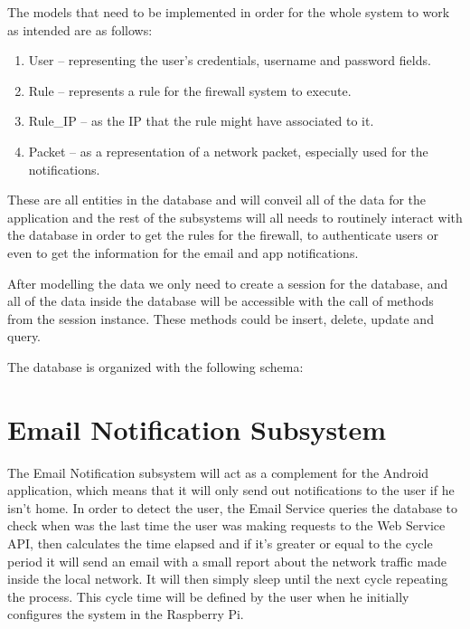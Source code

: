 \begin{enumerate}
The models that need to be implemented in order for the whole system to work as
intended are as follows:
\begin{enumerate}
	\item User -- representing the user's credentials, username and password
		fields.
	\item Rule -- represents a rule for the firewall system to execute.
	\item Rule\_IP -- as the IP that the rule might have associated to it.
	\item Packet -- as a representation of a network packet, especially used for
		the notifications.
\end{enumerate}

These are all entities in the database and will conveil all of the data for the
application and the rest of the subsystems will all needs to routinely interact
with the database in order to get the rules for the firewall, to authenticate
users or even to get the information for the email and app notifications.


After modelling the data we only need to create a session for the database, and
all of the data inside the database will be accessible with the call of methods
from the session instance. These methods could be insert, delete, update and
query.



The database is organized with the following schema:



\section{Email Notification Subsystem}
\label{chap4:sec:email-sys}
The Email Notification subsystem will act as a complement for the Android
application, which means that it will only send out notifications to the user if
he isn't home. In order to detect the user, the Email Service queries the
database to check when was the last time the user was making requests to the Web
Service API, then calculates the time elapsed and if it's greater or equal to
the cycle period it will send an email with a small report about the network
traffic made inside the local network. It will then simply sleep until the next
cycle repeating the process. This cycle time will be defined by the user when he
initially configures the system in the Raspberry Pi.


\end{enumerate}
